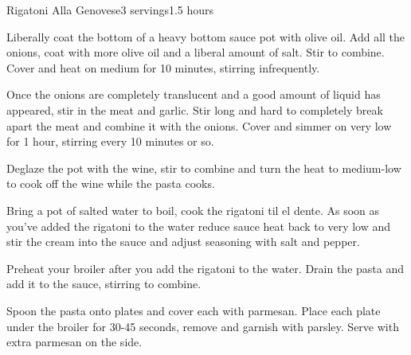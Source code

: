 \documentclass[../Cookbook.tex]{subfiles}
\begin{document}
\begin{recipe}{Rigatoni Alla Genovese}{3 servings}{1.5 hours}

Liberally coat the bottom of a heavy bottom sauce pot with olive oil. Add all the onions, coat with more olive oil and a liberal amount of salt. Stir to combine. Cover and heat on medium for 10 minutes, stirring infrequently.

Once the onions are completely translucent and a good amount of liquid has appeared, stir in the meat and garlic. Stir long and hard to completely break apart the meat and combine it with the onions. Cover and simmer on very low for 1 hour, stirring every 10 minutes or so.

Deglaze the pot with the wine, stir to combine and turn the heat to medium-low to cook off the wine while the pasta cooks.

Bring a pot of salted water to boil, cook the rigatoni til el dente. As soon as you've added the rigatoni to the water reduce sauce heat back to very low and stir the cream into the sauce and adjust seasoning with salt and pepper.

\newstep
Preheat your broiler after you add the rigatoni to the water. Drain the pasta and add it to the sauce, stirring to combine.

Spoon the pasta onto plates and cover each with parmesan.
Place each plate under the broiler for 30-45 seconds, remove and garnish with parsley. Serve with extra parmesan on the side.


\end{recipe}
\end{document}
